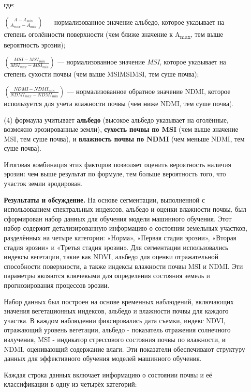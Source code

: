 \begin{multicols}{2}
где:

\(\left(\frac{A-A_{min}}{A_{max}-A_{min}}\right)\) --- нормализованное значение альбедо, которое указывает на степень
оголённости поверхности (чем ближе значение к A\textsubscript{max}, тем
выше вероятность эрозии);

\(\left(\frac{MSI-MSI_{min}}{MSI_{max}-MSI_{min}}\right)\) --- нормализованное значение \emph{MSI}, которое указывает на степень
сухости почвы (чем выше MSIMSIMSI, тем суше почва);

\(\left(\frac{NDMI-NDMI_{min}}{NDMI_{max}-NDMI_{min}}\right)\) ---
нормализованное обратное значение NDMI, которое используется для учета
влажности почвы (чем ниже NDMI, тем суше почва).

(4) формаула учитывает {\bfseries альбедо} (высокое альбедо указывает на
оголённые, возможно эрозированные земли), {\bfseries сухость почвы по MSI}
(чем выше значение MSI, тем суше почва), и {\bfseries влажность почвы по
NDMI} (чем меньше NDMI, тем суше почва).

Итоговая комбинация этих факторов позволяет оценить вероятность наличия
эрозии: чем выше результат по формуле, тем больше вероятность того, что
участок земли эродирован.

{\bfseries Результаты и обсуждение.} На основе сегментации, выполненной с
использованием спектральных индексов, альбедо и оценки влажности почвы,
был сформирован набор данных для обучения модели машинного обучения.
Этот набор содержит детализированную информацию о состоянии земельных
участков, разделённых на четыре категории: «Норма», «Первая стадия
эрозии», «Вторая стадия эрозии» и «Третья стадия эрозии». Для
сегментации использовались индексы вегетации, такие как NDVI, альбедо
для оценки отражательной способности поверхности, а также индексы
влажности почвы MSI и NDMI. Эти параметры являются ключевыми для
определения состояния земель и прогнозирования процессов эрозии.

Набор данных был построен на основе временных наблюдений, включающих
значения вегетационных индексов, альбедо и влажности почвы для каждого
участка. В каждом наблюдении фиксировались дата съемки, индекс NDVI,
отражающий уровень вегетации, альбедо - показатель отражения солнечного
излучения, MSI - индикатор стрессового состояния почвы по влажности, и
NDMI, оценивающий содержание влаги. Эти показатели обеспечивают
структуру данных для эффективного обучения моделей машинного обучения.

Каждая строка данных включает информацию о состоянии почвы и её
классификации в одну из четырёх категорий:


\end{multicols}
